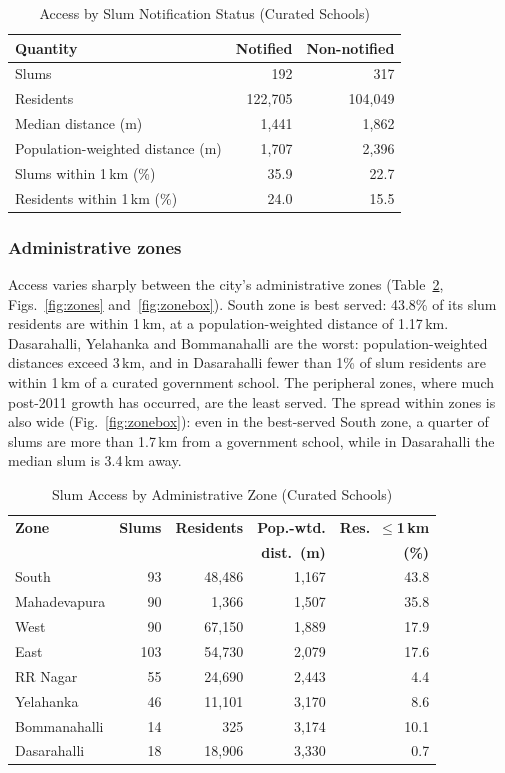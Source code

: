 \documentclass[conference]{IEEEtran}
\newcommand{\km}{\,km}
\begin{document}
\begin{table}[!t]
\centering
\caption{Access by Slum Notification Status (Curated Schools)}
\label{tab:notif}
\footnotesize
\begin{tabular}{@{}lrr@{}}
\toprule
\textbf{Quantity} & \textbf{Notified} & \textbf{Non-notified} \\
\midrule
Slums & 192 & 317 \\
Residents & 122,705 & 104,049 \\
Median distance (m) & 1,441 & 1,862 \\
Population-weighted distance (m) & 1,707 & 2,396 \\
Slums within 1\km{} (\%) & 35.9 & 22.7 \\
Residents within 1\km{} (\%) & 24.0 & 15.5 \\
\bottomrule
\end{tabular}
\end{table}

\subsubsection{Administrative zones}
Access varies sharply between the city's administrative zones (Table~\ref{tab:zones}, Figs.~\ref{fig:zones} and~\ref{fig:zonebox}). South zone is best served: 43.8\% of its slum residents are within 1\km{}, at a population-weighted distance of 1.17\km{}. Dasarahalli, Yelahanka and Bommanahalli are the worst: population-weighted distances exceed 3\km{}, and in Dasarahalli fewer than 1\% of slum residents are within 1\km{} of a curated government school. The peripheral zones, where much post-2011 growth has occurred, are the least served. The spread within zones is also wide (Fig.~\ref{fig:zonebox}): even in the best-served South zone, a quarter of slums are more than 1.7\km{} from a government school, while in Dasarahalli the median slum is 3.4\km{} away.

\begin{table}[!t]
\centering
\caption{Slum Access by Administrative Zone (Curated Schools)}
\label{tab:zones}
\footnotesize
\begin{tabular}{@{}lrrrr@{}}
\toprule
\textbf{Zone} & \textbf{Slums} & \textbf{Residents} & \textbf{Pop.-wtd.} & \textbf{Res.\ $\le$1\km{}} \\
 & & & \textbf{dist.\ (m)} & \textbf{(\%)} \\
\midrule
South & 93 & 48,486 & 1,167 & 43.8 \\
Mahadevapura & 90 & 1,366 & 1,507 & 35.8 \\
West & 90 & 67,150 & 1,889 & 17.9 \\
East & 103 & 54,730 & 2,079 & 17.6 \\
RR Nagar & 55 & 24,690 & 2,443 & 4.4 \\
Yelahanka & 46 & 11,101 & 3,170 & 8.6 \\
Bommanahalli & 14 & 325 & 3,174 & 10.1 \\
Dasarahalli & 18 & 18,906 & 3,330 & 0.7 \\
\bottomrule
\end{tabular}
\end{table}
\end{document}
